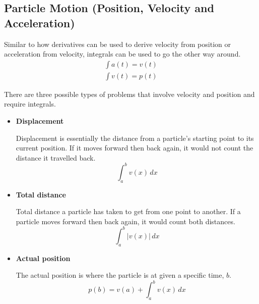 \documentclass[12pt]{article}
\begin{document}
\subsection{Particle Motion (Position, Velocity and Acceleration)}
Similar to how derivatives can be used to derive velocity from position or acceleration from velocity, integrals can be used to go the other way around.
\begin{gather*}
	\int a(t) = v(t) \\
	\int v(t) = p(t)
\end{gather*}

There are three possible types of problems that involve velocity and position and require integrals.
\begin{itemize}
	\item \textbf{Displacement}

	      Displacement is essentially the distance from a particle's starting point to its current position. If it moves forward then back again, it would not count the distance it travelled back.
	      \[ \int_{a}^{b} v(x) \, dx \]

	\item \textbf{Total distance}

	      Total distance a particle has taken to get from one point to another. If a particle moves forward then back again, it would count both distances.
	      \[ \int_{a}^{b} |v(x)| \, dx \]

	\item \textbf{Actual position}

	      The actual position is where the particle is at given a specific time, $b$.
	      \[ p(b) = v(a) + \int_{a}^{b} v(x) \, dx \]
\end{itemize}
\end{document}
